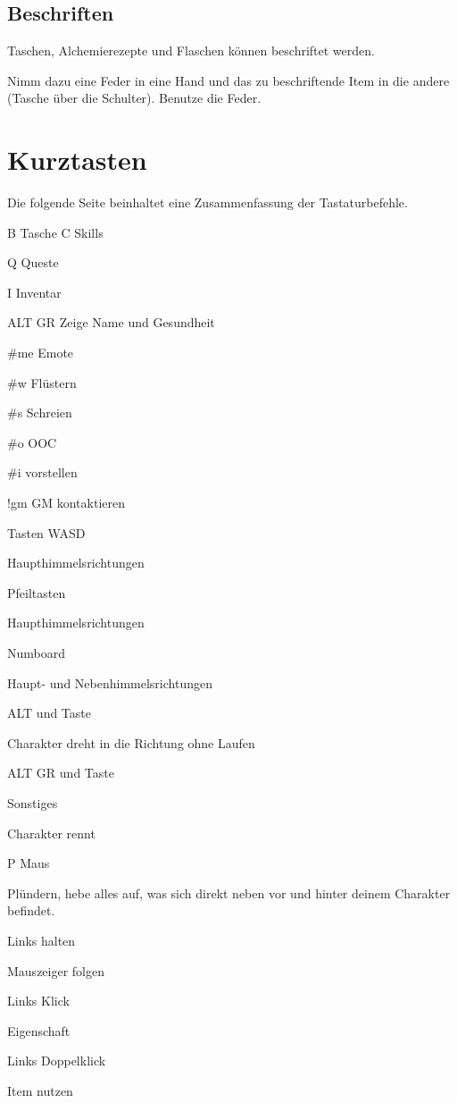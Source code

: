 \documentclass[a4paper,11pt]{book}
\begin{document}
\subsection{Beschriften}

Taschen, Alchemierezepte und Flaschen können beschriftet werden.

Nimm dazu eine Feder in eine Hand und das zu beschriftende Item in die andere (Tasche über die Schulter). Benutze die Feder.



\section{Kurztasten}

Die folgende Seite beinhaltet eine Zusammenfassung der Tastaturbefehle.

B  Tasche C  Skills

Q  Queste

I  Inventar

ALT GR  Zeige Name und Gesundheit

\#me  Emote

\#w  Flüstern

\#s  Schreien

\#o  OOC

\#i  vorstellen

!gm  GM kontaktieren

Tasten WASD

Haupthimmelsrichtungen

Pfeiltasten

Haupthimmelsrichtungen

Numboard

Haupt- und Nebenhimmelsrichtungen

ALT und Taste

Charakter dreht in die Richtung ohne Laufen

ALT GR und Taste

Sonstiges

Charakter rennt

P Maus

Plündern, hebe alles auf, was sich direkt neben vor und hinter deinem Charakter befindet.

Links halten

Mauszeiger folgen

Links Klick

Eigenschaft

Links Doppelklick

Item nutzen
\end{document}
